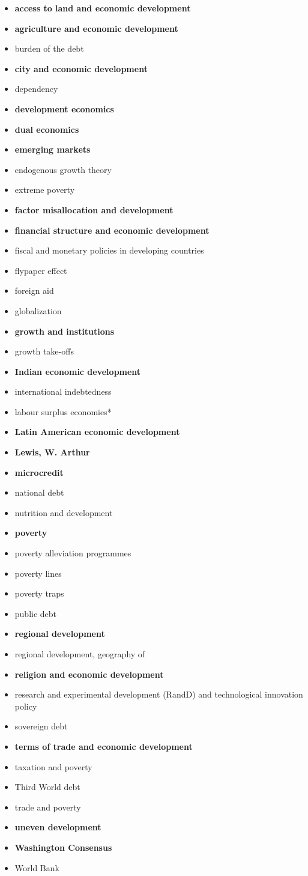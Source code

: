 \documentclass{nuevotema}
\begin{document}
\begin{itemize}
	\item \textbf{access to land and economic development}
	\item \textbf{agriculture and economic development}
	\item burden of the debt
	\item \textbf{city and economic development}
	\item dependency
	\item \textbf{development economics}
	\item \textbf{dual economics}
	\item \textbf{emerging markets}
	\item endogenous growth theory
	\item extreme poverty
	\item \textbf{factor misallocation and development}
	\item \textbf{financial structure and economic development}
	\item fiscal and monetary policies in developing countries
	\item flypaper effect
	\item foreign aid
	\item globalization
	\item \textbf{growth and institutions}
	\item growth take-offs
	\item \textbf{Indian economic development}
	\item international indebtedness
	\item labour surplus economies*
	\item \textbf{Latin American economic development}
	\item \textbf{Lewis, W. Arthur}
	\item \textbf{microcredit}
	\item national debt
	\item nutrition and development
	\item \textbf{poverty}
	\item poverty alleviation programmes
	\item poverty lines
	\item poverty traps
	\item public debt
	\item \textbf{regional development}
	\item regional development, geography of
	\item \textbf{religion and economic development}
	\item research and experimental development (RandD) and technological innovation policy
	\item sovereign debt
	\item \textbf{terms of trade and economic development}
	\item taxation and poverty
	\item Third World debt
	\item trade and poverty
	\item \textbf{uneven development}
	\item \textbf{Washington Consensus}
	\item World Bank
\end{itemize}
\end{document}
